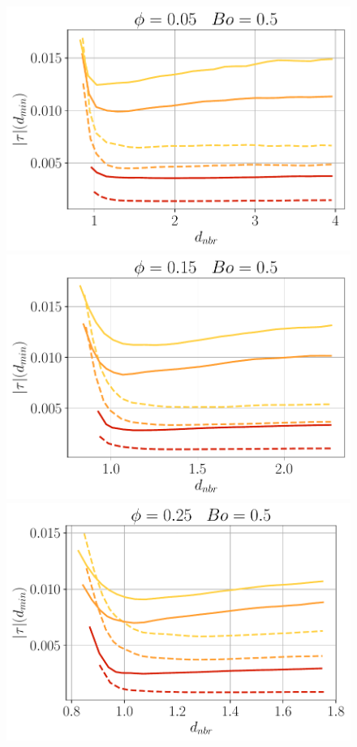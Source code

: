 \begin{figure}[h!]
        \includegraphics[height=0.16\textheight]{image/N_10/Pcond/probadissBo0_5PHI0_05.pdf}
        \includegraphics[height=0.16\textheight]{image/N_10/Pcond/probadissBo0_5PHI0_15.pdf}
        \includegraphics[height=0.16\textheight]{image/N_10/Pcond/probadissBo0_5PHI0_25.pdf}
        

\end{figure}
